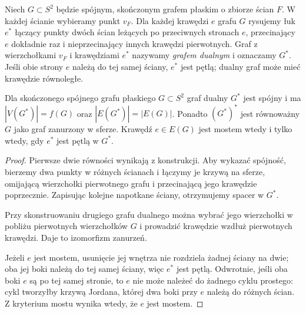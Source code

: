 \begin{definicja}
Niech $G\subset S^2$ będzie spójnym, skończonym grafem
płaskim o zbiorze ścian $F$. W każdej ścianie wybieramy
punkt $v_F$. Dla każdej krawędzi $e$ grafu $G$ rysujemy
łuk $e^*$ łączący punkty dwóch ścian leżących po
przeciwnych stronach $e$, przecinający $e$ dokładnie
raz i nieprzecinający innych krawędzi pierwotnych.
Graf z wierzchołkami $v_F$ i krawędziami $e^*$
nazywamy \emph{grafem dualnym} i oznaczamy $G^*$.
Jeśli obie strony $e$ należą do tej samej ściany,
$e^*$ jest pętlą; dualny graf może mieć krawędzie równoległe.
\end{definicja}

\begin{stwierdzenie}
\label{thm:tg-dual-basic}
Dla skończonego spójnego grafu płaskiego $G\subset S^2$
graf dualny $G^*$ jest spójny i ma
$|V(G^*)|=f(G)$ oraz $|E(G^*)|=|E(G)|$.
Ponadto $(G^*)^*$ jest równoważny $G$ jako graf zanurzony
w sferze. Krawędź $e\in E(G)$ jest mostem wtedy i tylko
wtedy, gdy $e^*$ jest pętlą w $G^*$.
\end{stwierdzenie}

\begin{proof}
Pierwsze dwie równości wynikają z konstrukcji.
Aby wykazać spójność, bierzemy dwa punkty w różnych
ścianach i łączymy je krzywą na sferze, omijającą
wierzchołki pierwotnego grafu i przecinającą jego
krawędzie poprzecznie. Zapisując kolejne napotkane
ściany, otrzymujemy spacer w $G^*$.

Przy skonstruowaniu drugiego grafu dualnego można
wybrać jego wierzchołki w pobliżu pierwotnych
wierzchołków $G$ i prowadzić krawędzie wzdłuż
pierwotnych krawędzi. Daje to izomorfizm zanurzeń.

Jeżeli $e$ jest mostem, usunięcie jej wnętrza nie
rozdziela żadnej ściany na dwie; oba jej boki należą
do tej samej ściany, więc $e^*$ jest pętlą.
Odwrotnie, jeśli oba boki $e$ są po tej samej stronie,
to $e$ nie może należeć do żadnego cyklu prostego:
cykl tworzyłby krzywą Jordana, której dwa boki
przy $e$ należą do różnych ścian. Z kryterium mostu
wynika wtedy, że $e$ jest mostem.
\end{proof}

